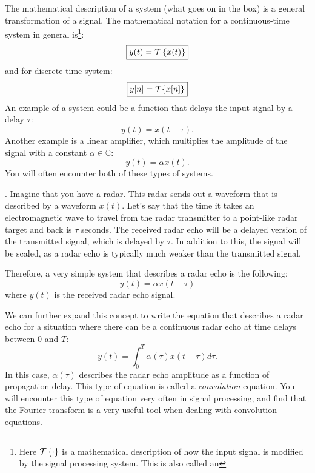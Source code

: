 The mathematical description of a system (what goes on in the box) is a general transformation of a signal. 
The mathematical notation for a continuous-time system in general is\footnote{Here $\spop$ is a mathematical description of how the input signal is modified by the signal processing system. This is also called an
}:
\begin{equation}
\boxed{
y(t) = \spop[x(t)]
}
\end{equation}
and for discrete-time system:
\begin{equation}
\boxed{
y[n] = \spopb\{x[n]\}
}
\end{equation}
An example of a system could be a function that delays the input
signal by a delay $\tau$:
\begin{equation}
y(t) = x(t-\tau).
\end{equation}
Another example is a linear amplifier, which multiplies the amplitude
of the signal with a constant $\alpha \in \mathbb{C}$:
\begin{equation}
y(t) = \alpha x(t).
\end{equation}
You will often encounter both of these types of systems.

. Imagine that you have a radar. This radar sends out a waveform that is described by a waveform $x(t)$. Let's say that the
time it takes an electromagnetic wave to travel from the radar transmitter to a point-like radar target and back is $\tau$ seconds. The received radar echo will be a delayed version of the transmitted signal, which is delayed by $\tau$. In addition to this, the signal will be scaled, as a radar echo is typically much weaker than the transmitted signal.

Therefore, a very simple system that describes a radar echo is the following:
\begin{equation}
y(t) = \alpha x(t-\tau)
\end{equation}
where $y(t)$ is the received radar echo signal.

We can further expand this concept to write the equation that describes a radar echo for a situation where there can be a continuous radar echo at time delays between $0$ and $T$:
\begin{equation}
y(t) = \int_0^T \alpha(\tau) x(t-\tau) d\tau.
\end{equation}
In this case, $\alpha(\tau)$ describes the radar echo amplitude as a function of propagation delay. This type of equation is called a \emph{convolution} equation. 
You will encounter this type of equation very often in signal processing, and find that the Fourier transform is a very useful tool when dealing with convolution equations.

